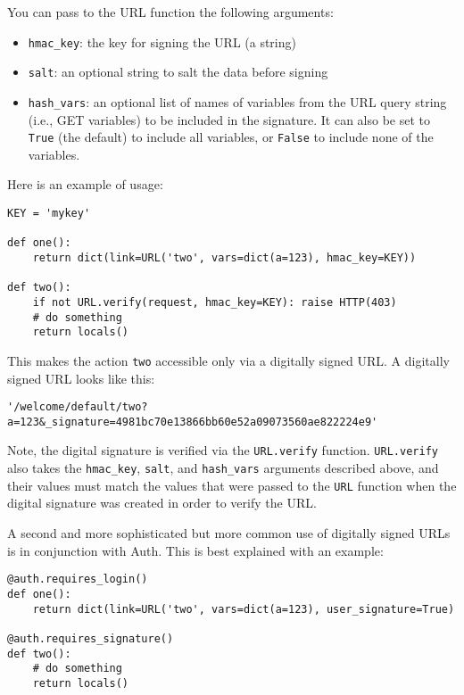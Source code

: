 \documentclass[justified,sixbynine,notoc]{tufte-book}
\def\ft{\small\tt}
\begin{document}
\begin{fullwidth}
You can pass to the URL function the following arguments:
\begin{itemize}
\item {\ft hmac\_key}: the key for signing the URL (a string)

\item {\ft salt}: an optional string to salt the data before signing

\item {\ft hash\_vars}: an optional list of names of variables from the URL query string (i.e., GET variables) to be included in the signature. It can also be set to {\ft True} (the default) to include all variables, or {\ft False} to include none of the variables.
\end{itemize}

Here is an example of usage:

\begin{lstlisting}
KEY = 'mykey'

def one():
    return dict(link=URL('two', vars=dict(a=123), hmac_key=KEY))

def two():
    if not URL.verify(request, hmac_key=KEY): raise HTTP(403)
    # do something
    return locals()
\end{lstlisting}

This makes the action {\ft two} accessible only via a digitally signed URL. A digitally signed URL looks like this:
\begin{lstlisting}
'/welcome/default/two?a=123&_signature=4981bc70e13866bb60e52a09073560ae822224e9'
\end{lstlisting}

Note, the digital signature is verified via the {\ft URL.verify} function. {\ft URL.verify} also takes the {\ft hmac\_key}, {\ft salt}, and {\ft hash\_vars} arguments described above, and their values must match the values that were passed to the {\ft URL} function when the digital signature was created in order to verify the URL.

A second and more sophisticated but more common use of digitally signed URLs is in conjunction with Auth. This is best explained with an example:

\begin{lstlisting}
@auth.requires_login()
def one():
    return dict(link=URL('two', vars=dict(a=123), user_signature=True)

@auth.requires_signature()
def two():
    # do something
    return locals()
\end{lstlisting}


\end{fullwidth}
\end{document}

